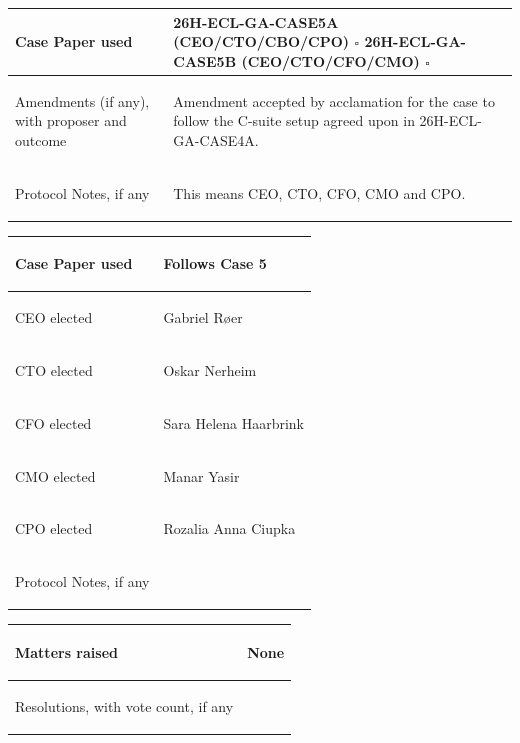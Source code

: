 \documentclass{../../Common/Latex/Templates/rapport}
\begin{document}
\begin{tabularx}{\textwidth}{|>{\bfseries\raggedright\arraybackslash}p{5cm}|X|}
  \hline
  Case Paper used                                & \rule{0pt}{0.9cm}26H-ECL-GA-CASE5A (CEO/CTO/CBO/CPO) \quad $\square$ \quad\quad 26H-ECL-GA-CASE5B (CEO/CTO/CFO/CMO) \quad $\square$ \\
  \hline
  Amendments (if any), with proposer and outcome & \rule{0pt}{1.2cm}Amendment accepted by acclamation for the case to follow the C-suite setup agreed upon in 26H-ECL-GA-CASE4A.       \\
  \hline
  Protocol Notes, if any                         & \rule{0pt}{1.2cm}This means CEO, CTO, CFO, CMO and CPO.                                                                             \\
  \hline
\end{tabularx}

\begin{tabularx}{\textwidth}{|>{\bfseries\raggedright\arraybackslash}p{5cm}|X|}
  \hline
  Case Paper used        & \rule{0pt}{0.9cm}Follows Case 5        \\
  \hline
  CEO elected            & \rule{0pt}{0.9cm}Gabriel Røer          \\
  \hline
  CTO elected            & \rule{0pt}{0.9cm}Oskar Nerheim         \\
  \hline
  CFO elected            & \rule{0pt}{0.9cm}Sara Helena Haarbrink \\
  \hline
  CMO elected            & \rule{0pt}{0.9cm}Manar Yasir           \\
  \hline
  CPO elected            & \rule{0pt}{0.9cm}Rozalia Anna Ciupka   \\
  \hline
  Protocol Notes, if any & \rule{0pt}{1.2cm}                      \\
  \hline
\end{tabularx}

\begin{tabularx}{\textwidth}{|>{\bfseries\raggedright\arraybackslash}p{5cm}|X|}
  \hline
  Matters raised                       & \rule{0pt}{1.8cm}None \\
  \hline
  Resolutions, with vote count, if any & \rule{0pt}{1.8cm}     \\
  \hline
\end{tabularx}
\end{document}
